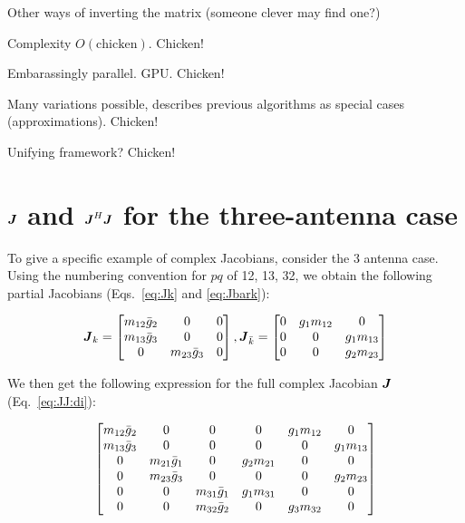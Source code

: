 \documentclass[useAMS,usenatbib]{mn2e}
\newcommand{\mat}[1]{{\bmath{#1}}}
\newcommand{\JJ}{\mat{J}} %
\begin{document}
Other ways of inverting the matrix (someone clever may find one?)

Complexity $O(\mathrm{chicken}).$ Chicken!

Embarassingly parallel. GPU. Chicken!

Many variations possible, describes previous algorithms as special cases (approximations). Chicken!

Unifying framework? Chicken!




\appendix

\section{$\JJ$ and $\JJ^H\JJ$ for the three-antenna case}
\label{sec:3ant}

To give a specific example of complex Jacobians, consider the 3 antenna case.
Using the numbering convention for $pq$ of 12, 13, 32, we obtain the following partial Jacobians
(Eqs.~\ref{eq:Jk} and \ref{eq:Jbark}):

\[
\JJ_k = \Matrix{ccc}{m_{12}\bar{g}_2 & 0 & 0 \\ m_{13}\bar{g}_3 & 0 & 0 \\ 0 & m_{23}\bar{g}_3 & 0 },
\JJ_{\bar{k}} = \Matrix{ccc}{0 & g_1 m_{12} & 0 \\ 0 & 0 & g_1 m_{13} \\ 0 & 0 & g_2 m_{23} }
\]

We then get the following expression
for the full complex Jacobian $\JJ$ (Eq.~\ref{eq:JJ:di}):

\begin{equation}
\label{eq:JJ:3ant}
\Matrix{cccccc}{
  m_{12}\bar{g}_2 & 0               & 0 &  0          & g_1 m_{12} & 0           \\
  m_{13}\bar{g}_3 & 0               & 0 &  0          & 0          & g_1 m_{13}  \\
  0               & m_{21}\bar{g}_1 & 0 &  g_2 m_{21} & 0          & 0  \\
  0               & m_{23}\bar{g}_3 & 0 &  0          & 0          & g_2 m_{23} \\
  0               & 0               & m_{31}\bar{g}_1 & g_1 m_{31} & 0          & 0  \\
  0               & 0               & m_{32}\bar{g}_2 & 0 & g_3 m_{32} & 0 \\
}
\end{equation}
\end{document}
